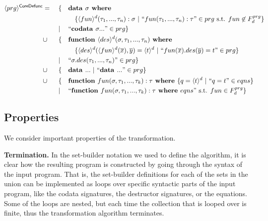 \begin{algorithm}

\begin{align*}
\langle prg \rangle^{\textsf{CoreDefunc}} & = ~&& \{ && \textrm{\textbf{data }} \sigma \textrm{\textbf{ where }} \span\span\span\span \\
& && && && \{ \langle fun \rangle^d (\tau_1, ..., \tau_n): \sigma ~ | ~ `` fun(\tau_1, ..., \tau_n): \tau " \in prg \text{ s.t. } fun \not\in F^{prg}_d \} \\
& && | && `` \textrm{\textbf{codata }} \sigma ... " \in prg \} \span\span\span\span \\
& \cup && \{ && \textrm{\textbf{function }} \langle des \rangle^d (\sigma, \tau_1, ..., \tau_n) \textrm{\textbf{ where}} \span\span\span\span \\
& && && && \{ \langle des \rangle^d (\langle fun \rangle^d (\overline{x}), \overline{y}) = \langle t \rangle^d ~ | ~ `` fun(\overline{x}).des(\overline{y}) = t " \in prg \} \\
& && | && `` \sigma.des(\tau_1, ..., \tau_n) " \in prg \} \span\span\span\span \\
& \cup && \{ && \textrm{\textbf{data }} ... ~ | ~ `` \textrm{\textbf{data }} ... " \in prg \} \span\span\span\span \\
& \cup && \{ && \textrm{\textbf{function }} fun(\sigma, \tau_1, ..., \tau_k): \tau \textrm{\textbf{ where }} \{ q = \langle t \rangle^d ~ | ~ ``q = t" \in eqns \} \span\span\span\span \\
& && | && `` \textrm{\textbf{function }} fun(\sigma, \tau_1, ..., \tau_k): \tau \textrm{\textbf{ where }} eqns " \text{ s.t. } fun \in F^{prg}_d \} \span\span\span\span
\end{align*}

\end{algorithm}

\subsection{Properties}

We consider important properties of the transformation.

\textbf{Termination.} In the set-builder notation we used to define the algorithm, it is clear how the resulting program is constructed by going through the syntax of the input program. That is, the set-builder definitions for each of the sets in the union can be implemented as loops over specific syntactic parts of the input program, like the codata signatures, the destructor signatures, or the equations. Some of the loops are nested, but each time the collection that is looped over is finite, thus the transformation algorithm terminates.

